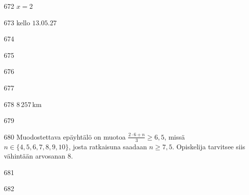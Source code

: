 \begin{Vastaus}{672}
		$x=2$
    
\end{Vastaus}
\begin{Vastaus}{673}
		kello $13.05.27$
    
\end{Vastaus}
\begin{Vastaus}{674}
    
\end{Vastaus}
\begin{Vastaus}{675}

	
\end{Vastaus}
\begin{Vastaus}{676}
    
\end{Vastaus}
\begin{Vastaus}{677}
	
\end{Vastaus}
\begin{Vastaus}{678}
        $8\,257$\,km
    
\end{Vastaus}
\begin{Vastaus}{679}
    
\end{Vastaus}
\begin{Vastaus}{680}
Muodostettava epäyhtälö on muotoa $\frac{2\cdot 6+n}{3}\geq 6,5$, missä $n \in \lbrace 4,5,6,7,8,9,10 \rbrace$, josta ratkaisuna saadaan $n\geq 7,5$. Opiskelija tarvitsee siis vähintään arvosanan $8$.
\end{Vastaus}
\begin{Vastaus}{681}
  
\end{Vastaus}
\begin{Vastaus}{682}
\end{Vastaus}
